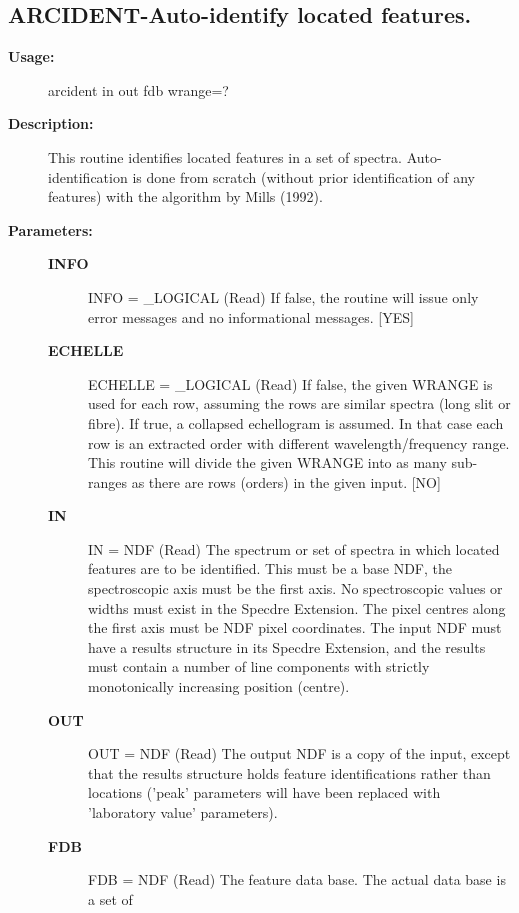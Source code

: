 \subsection{ARCIDENT-\label{ARCIDENT}Auto-identify located features.}
\begin{description}

\item [\textbf{Usage:}]

   arcident in out fdb wrange=?


\item [\textbf{Description:}]
   This routine identifies located features in a set of spectra.
   Auto-identification is done from scratch (without prior
   identification of any features) with the algorithm by Mills
   (1992).


\item [\textbf{Parameters:}]
\begin{description}
\item [\textbf{INFO}]
INFO = \_LOGICAL (Read)
   If false, the routine will issue only error messages and no
   informational messages. [YES]
\item [\textbf{ECHELLE}]
ECHELLE = \_LOGICAL (Read)
   If false, the given WRANGE is used for each row, assuming the
   rows are similar spectra (long slit or fibre). If true, a
   collapsed echellogram is assumed. In that case each row is an
   extracted order with different wavelength/frequency range. This
   routine will divide the given WRANGE into as many sub-ranges as
   there are rows (orders) in the given input. [NO]
\item [\textbf{IN}]
IN = NDF (Read)
   The spectrum or set of spectra in which located features are to
   be identified. This must be a base NDF, the spectroscopic axis
   must be the first axis. No spectroscopic values or widths must
   exist in the Specdre Extension. The pixel centres along the
   first axis must be NDF pixel coordinates. The input NDF must
   have a results structure in its Specdre Extension, and the
   results must contain a number of line components with strictly
   monotonically increasing position (centre).
\item [\textbf{OUT}]
OUT = NDF (Read)
   The output NDF is a copy of the input, except that the results
   structure holds feature identifications rather than locations
   ('peak' parameters will have been replaced with 'laboratory
   value' parameters).
\item [\textbf{FDB}]
FDB = NDF (Read)
   The feature data base. The actual data base is a set of

\end{description}
\end{description}
